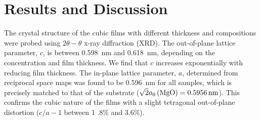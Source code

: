 \documentclass[reprint,aip,apl,floatfix,linenumbers,superscriptaddress]{revtex4-1}
\begin{document}
%

\section{Results and Discussion}
\label{sec:results_discussion}

The crystal structure of the cubic  films with different thickness 
and compositions were probed using $2\theta-\theta$ x-ray diffraction (XRD). 
The out-of-plane lattice parameter, $c$, is between \SI{0.598}{\nano\metre} 
and \SI{0.618}{\nano\metre}, depending on the 
 concentration and film thickness. We find that  $c$ increases 
exponentially with reducing film thickness. The in-plane lattice parameter, $a
$, determined from reciprocal space maps was 
found to be \SI{0.596}{\nano\metre} for all samples, which is precisely 
matched to that of the  substrate ($\sqrt{2} a_0\left(\ce{MgO} \right)
 = \SI{0.5956}{\nano\metre}$). This confirms the cubic nature of the  
films with a slight tetragonal out-of-plane distortion ($c/a-1$ between \num{1
.8}\% and \num{3.6}\%).
\end{document}
